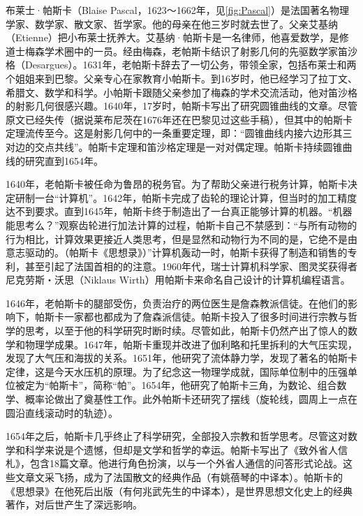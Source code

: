 \documentclass[b5paper]{ctexart}
\begin{document}
\begin{mdframed}
布莱士·帕斯卡（Blaise Pascal，1623～1662年，见\cref{fig:Pascal}）是法国著名物理学家、数学家、散文家、哲学家。他的母亲在他三岁时就去世了。父亲艾基纳（Etienne）把小布莱士抚养大。艾基纳·帕斯卡是一名律师，他喜爱数学，是修道士梅森学术圈中的一员。经由梅森，老帕斯卡结识了射影几何的先驱数学家笛沙格（Desargues）。1631年，老帕斯卡辞去了一切公务，带领全家，包括布莱士和两个姐姐来到巴黎。父亲专心在家教育小帕斯卡。到16岁时，他已经学习了拉丁文、希腊文、数学和科学。小帕斯卡跟随父亲参加了梅森的学术交流活动，他对笛沙格的射影几何很感兴趣。1640年，17岁时，帕斯卡写出了研究圆锥曲线的文章。尽管原文已经失传（据说莱布尼茨在1676年还在巴黎见过这些手稿），但其中的帕斯卡定理流传至今。这是射影几何中的一条重要定理，即：“圆锥曲线内接六边形其三对边的交点共线”。帕斯卡定理和笛沙格定理是一对对偶定理。帕斯卡持续圆锥曲线的研究直到1654年。

1640年，老帕斯卡被任命为鲁昂的税务官。为了帮助父亲进行税务计算，帕斯卡决定研制一台“计算机”。1642年，帕斯卡完成了齿轮的理论计算，但当时的加工精度达不到要求。直到1645年，帕斯卡终于制造出了一台真正能够计算的机器。“机器能思考么？”观察齿轮进行加法计算的过程，帕斯卡自己不禁感到：“与所有动物的行为相比，计算效果更接近人类思考，但是显然和动物行为不同的是，它绝不是由意志驱动的。（帕斯卡《思想录》）”计算机轰动一时，帕斯卡获得了制造和销售的专利，甚至引起了法国首相的的注意。1960年代，瑞士计算机科学家、图灵奖获得者尼克劳斯・沃思（Niklaus Wirth）用帕斯卡来命名自己设计的计算机编程语言。

1646年，老帕斯卡的腿部受伤，负责治疗的两位医生是詹森教派信徒。在他们的影响下，帕斯卡一家都也都成为了詹森派信徒。帕斯卡投入了很多时间进行宗教与哲学的思考，以至于他的科学研究时断时续。尽管如此，帕斯卡仍然产出了惊人的数学和物理学成果。1647年，帕斯卡重现并改进了伽利略和托里拆利的大气压实现，发现了大气压和海拔的关系。1651年，他研究了流体静力学，发现了著名的帕斯卡定律，这是今天水压机的原理。为了纪念这一物理学成就，国际单位制中的压强单位被定为“帕斯卡”，简称“帕”。1654年，他研究了帕斯卡三角，为数论、组合数学、概率论做出了奠基性工作。此外帕斯卡还研究了摆线（旋轮线，圆周上一点在圆沿直线滚动时的轨迹）。

1654年之后，帕斯卡几乎终止了科学研究，全部投入宗教和哲学思考。尽管这对数学和科学来说是个遗憾，但却是文学和哲学的幸运。帕斯卡写出了《致外省人信札》，包含18篇文章。他进行角色扮演，以与一个外省人通信的问答形式论战。这些文章文采飞扬，成为了法国散文的经典作品（有姚蓓琴的中译本）。帕斯卡的《思想录》在他死后出版（有何兆武先生的中译本），是世界思想文化史上的经典著作，对后世产生了深远影响\cite{Jerphagnon-Orcibal-2025}。
\end{mdframed}
\end{document}
